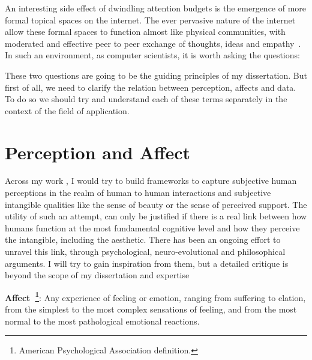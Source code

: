 An interesting side effect of dwindling attention budgets is the emergence of more formal topical spaces on the internet. The ever pervasive nature of the internet allow these formal spaces to function almost like physical communities, with moderated and effective peer to peer exchange of thoughts, ideas and empathy~\cite{kummervold2002social,squire2015should,hwang2010social}.
In such an environment, as computer scientists, it is worth asking the questions:

\noindent{}

\vspace{1cm}
These two questions are going to be the guiding principles of my dissertation. But first of all, we need to clarify the relation between perception, affects and data. To do so we should try and understand each of these terms separately in the context of the field of application.

\section{Perception and Affect}
Across my work , I would try to build frameworks to capture subjective human perceptions in the realm of human to human interactions and subjective intangible qualities like the sense of beauty or the sense of perceived support. The utility of such an attempt, can only be justified if there is a real link between how humans function at the most fundamental cognitive level and how they perceive the intangible, including the aesthetic. There has been an ongoing effort to unravel this link, through psychological, neuro-evolutional and philosophical arguments. I will try to gain inspiration from them, but a detailed critique is beyond the scope of my dissertation and expertise\\
\begin{definition}
    \textbf{Affect~\footnote{American Psychological Association definition.}}: Any experience of feeling or emotion, ranging from suffering to elation, from the simplest to the most complex sensations of feeling, and from the most normal to the most pathological emotional reactions.\\
\end{definition}


